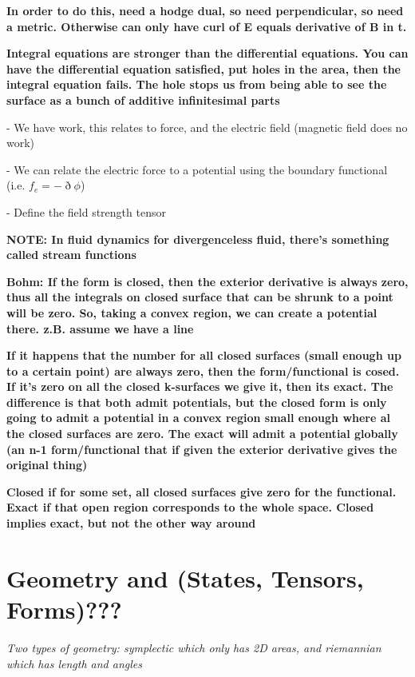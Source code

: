 \documentclass{book}
\begin{document}
\textbf{In order to do this, need a hodge dual, so need perpendicular, so need a metric. Otherwise can only have curl of E equals derivative of B in t. }

\textbf{Integral equations are stronger than the differential equations. You can have the differential equation satisfied, put holes in the area, then the integral equation fails. The hole stops us from being able to see the surface as a bunch of additive infinitesimal parts}

- We have work, this relates to force, and the electric field (magnetic field does no work)

- We can relate the electric force to a potential using the boundary functional (i.e. $f_e = -\eth\phi$)

- Define the field strength tensor


\textbf{NOTE: In fluid dynamics for divergenceless fluid, there's something called stream functions}

\textbf{Bohm: If the form is closed, then the exterior derivative is always zero, thus all the integrals on closed surface that can be shrunk to a point will be zero. So, taking a convex region, we can create a potential there. z.B. assume we have a line}

\textbf{If it happens that the number for all closed surfaces (small enough up to a certain point) are always zero, then the form/functional is cosed. If it's zero on all the closed k-surfaces we give it, then its exact. The difference is that both admit potentials, but the closed form is only going to admit a potential in a convex region small enough where al the closed surfaces are zero. The exact will admit a potential globally (an n-1 form/functional that if given the exterior derivative gives the original thing)}

\textbf{Closed if for some set, all closed surfaces give zero for the functional. Exact if that open region corresponds to the whole space. Closed implies exact, but not the other way around}







\chapter{Geometry and (States, Tensors, Forms)???}

\emph{Two types of geometry: symplectic which only has 2D areas, and riemannian which has length and angles}
\end{document}
